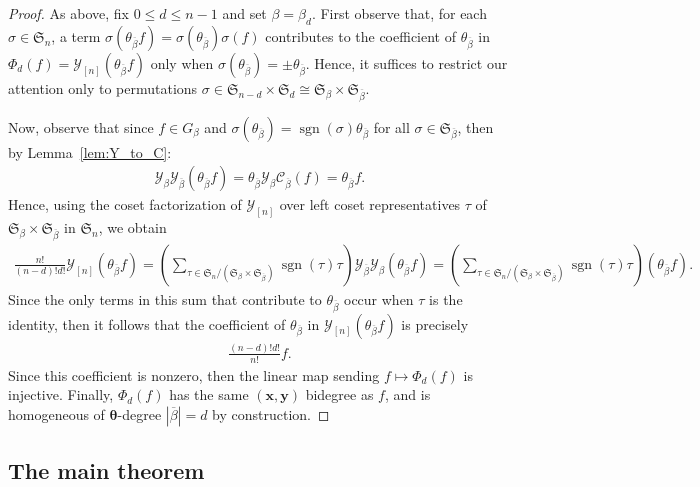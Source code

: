 \documentclass[11pt, noadjust, reqno]{amsart}
\theoremstyle{definition}
\theoremstyle{remark}
\numberwithin{equation}{section}
\newcommand{\0}{\emptyset}
\renewcommand{\S}{\mathfrak{S}}
\newcommand{\cC}{\mathcal{C}}
\newcommand{\cY}{\mathcal{Y}}
\DeclareMathOperator{\sgn}{sgn}
\begin{document}
\begin{proof}
As above, fix $0\leq d \leq n-1$ and set $\beta = \beta_d$. 
First observe that, for each $\sigma \in \S_n$, a term $\sigma(\theta_{\overline{\beta}} f)=\sigma(\theta_{\overline{\beta}})\sigma(f)$ contributes to the coefficient of $\theta_{\overline{\beta}}$
in $\Phi_d(f) = \cY_{[n]} (\theta_{\overline{\beta}} f)$
only when $\sigma(\theta_{\overline{\beta}}) = \pm \theta_{\overline{\beta}}$. Hence, it suffices to restrict our attention only to permutations $\sigma \in \mathfrak{S}_{n-d} \times \mathfrak{S}_{d} \cong \mathfrak{S}_\beta \times \mathfrak{S}_{\overline{\beta}}$.

Now, observe that since $f \in G_\beta$ and $\sigma(\theta_{\overline{\beta}} )= \sgn(\sigma)\theta_{\overline{\beta}} $ for all $\sigma \in \S_{\overline{\beta}}$, then by Lemma~\ref{lem:Y_to_C}:
\begin{align*}
\cY_\beta \cY_{\overline{\beta}} (\theta_{\overline{\beta}} f)
= \theta_{\overline{\beta}} \cY_\beta \cC_{\overline{\beta}} (f) 
= \theta_{\overline{\beta}} f.
\end{align*}
Hence, using the coset factorization of $\cY_{[n]}$ over left coset representatives $\tau$ of $\mathfrak{S}_\beta \times \mathfrak{S}_{\overline{\beta}}$ in $\mathfrak{S}_n$, we obtain
  \begin{align*}
  \frac{n!}{(n-d)!d!}\cY_{[n]}(\theta_{\overline{\beta}} f)
  = \left(\sum_{\tau \in  \S_n /(  \S_\beta \times \S_{\overline{\beta}})} \sgn(\tau) \tau \right)  \cY_{\overline{\beta}} \cY_\beta (\theta_{\overline{\beta}} f)
  = \left(\sum_{\tau \in  \S_n /(  \S_\beta \times \S_{\overline{\beta}})} \sgn(\tau) \tau \right)(\theta_{\overline{\beta}} f). 
    \end{align*} 
    Since the only terms in this sum that contribute to  $\theta_{\overline{\beta}}$ occur when $\tau$ is the identity, then it follows that the coefficient of $\theta_{\overline{\beta}}$ in $\cY_{[n]}(\theta_{\overline{\beta}} f)$ is precisely
    \begin{align*}
  \frac{(n-d)!d!}{n!} f. 
    \end{align*} 
    Since this coefficient is nonzero, then the linear map sending $f \mapsto \Phi_d(f)$ is injective.   
    Finally, $\Phi_d(f)$ has the same $(\bm{x},\bm{y})$ bidegree as $f$, and is homogeneous of $\bm{\theta}$-degree $|{\overline{\beta}}| =d$ by construction.
\end{proof}


\subsection{The main theorem}\label{subsec:main theorem}
\end{document}
